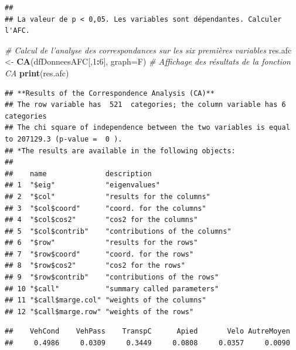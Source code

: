 \documentclass[
  11pt,
  french,
]{book}
\makeatletter
\newenvironment{Shaded}{\begin{snugshade}}{\end{snugshade}}
\newcommand{\CommentTok}[1]{\textcolor[rgb]{0.56,0.35,0.01}{\textit{#1}}}
\newcommand{\DataTypeTok}[1]{\textcolor[rgb]{0.13,0.29,0.53}{#1}}
\newcommand{\DecValTok}[1]{\textcolor[rgb]{0.00,0.00,0.81}{#1}}
\newcommand{\KeywordTok}[1]{\textcolor[rgb]{0.13,0.29,0.53}{\textbf{#1}}}
\newcommand{\NormalTok}[1]{#1}
\newcommand{\OperatorTok}[1]{\textcolor[rgb]{0.81,0.36,0.00}{\textbf{#1}}}
\newcommand{\StringTok}[1]{\textcolor[rgb]{0.31,0.60,0.02}{#1}}
\newenvironment{kframe}{%
\medskip{}
\setlength{\fboxsep}{.8em}
 \def\at@end@of@kframe{}%
 \ifinner\ifhmode%
  \def\at@end@of@kframe{\end{minipage}}%
  \begin{minipage}{\columnwidth}%
 \fi\fi%
 \def\FrameCommand##1{\hskip\@totalleftmargin \hskip-\fboxsep
 \colorbox{shadecolor}{##1}\hskip-\fboxsep
     \hskip-\linewidth \hskip-\@totalleftmargin \hskip\columnwidth}%
 \MakeFramed {\advance\hsize-\width
   \@totalleftmargin\z@ \linewidth\hsize
   \@setminipage}}%
 {\par\unskip\endMakeFramed%
 \at@end@of@kframe}
\renewenvironment{Shaded}{\begin{kframe}}{\end{kframe}}
\makeatother
\begin{document}
\begin{verbatim}
## 
## La valeur de p < 0,05. Les variables sont dépendantes. Calculer l'AFC.
\end{verbatim}

\begin{Shaded}
\begin{Highlighting}[]
\CommentTok{# Calcul de l'analyse des correspondances sur les six premières variables}
\NormalTok{res.afc <-}\StringTok{ }\KeywordTok{CA}\NormalTok{(dfDonneesAFC[,}\DecValTok{1}\OperatorTok{:}\DecValTok{6}\NormalTok{], }\DataTypeTok{graph=}\NormalTok{F)}
\CommentTok{# Affichage des résultats de la fonction CA}
\KeywordTok{print}\NormalTok{(res.afc)}
\end{Highlighting}
\end{Shaded}

\begin{verbatim}
## **Results of the Correspondence Analysis (CA)**
## The row variable has  521  categories; the column variable has 6 categories
## The chi square of independence between the two variables is equal to 207129.3 (p-value =  0 ).
## *The results are available in the following objects:
## 
##    name              description                   
## 1  "$eig"            "eigenvalues"                 
## 2  "$col"            "results for the columns"     
## 3  "$col$coord"      "coord. for the columns"      
## 4  "$col$cos2"       "cos2 for the columns"        
## 5  "$col$contrib"    "contributions of the columns"
## 6  "$row"            "results for the rows"        
## 7  "$row$coord"      "coord. for the rows"         
## 8  "$row$cos2"       "cos2 for the rows"           
## 9  "$row$contrib"    "contributions of the rows"   
## 10 "$call"           "summary called parameters"   
## 11 "$call$marge.col" "weights of the columns"      
## 12 "$call$marge.row" "weights of the rows"
\end{verbatim}

\begin{Shaded}
\end{Shaded}

\begin{verbatim}
##    VehCond    VehPass    TranspC      Apied       Velo AutreMoyen 
##     0.4986     0.0309     0.3449     0.0808     0.0357     0.0090
\end{verbatim}
\end{document}
